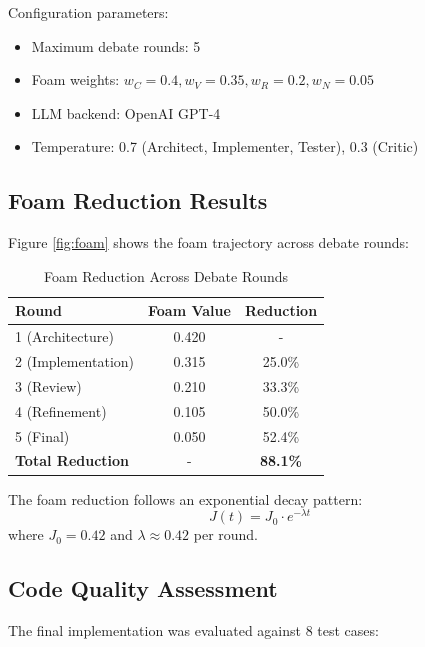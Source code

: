\documentclass[12pt,a4paper]{article}
\begin{document}
Configuration parameters:
\begin{itemize}
    \item Maximum debate rounds: 5
    \item Foam weights: $w_C=0.4, w_V=0.35, w_R=0.2, w_N=0.05$
    \item LLM backend: OpenAI GPT-4
    \item Temperature: 0.7 (Architect, Implementer, Tester), 0.3 (Critic)
\end{itemize}

\subsection{Foam Reduction Results}

Figure \ref{fig:foam} shows the foam trajectory across debate rounds:

\begin{table}[htbp]
\centering
\caption{Foam Reduction Across Debate Rounds}
\label{tab:foam}
\begin{tabular}{lcc}
\toprule
Round & Foam Value & Reduction \\
\midrule
1 (Architecture) & 0.420 & - \\
2 (Implementation) & 0.315 & 25.0\% \\
3 (Review) & 0.210 & 33.3\% \\
4 (Refinement) & 0.105 & 50.0\% \\
5 (Final) & 0.050 & 52.4\% \\
\midrule
\textbf{Total Reduction} & - & \textbf{88.1\%} \\
\bottomrule
\end{tabular}
\end{table}

The foam reduction follows an exponential decay pattern:
\begin{equation}
J(t) = J_0 \cdot e^{-\lambda t}
\end{equation}
where $J_0 = 0.42$ and $\lambda \approx 0.42$ per round.

\subsection{Code Quality Assessment}

The final implementation was evaluated against 8 test cases:
\end{document}
